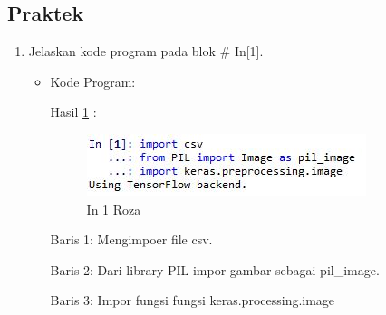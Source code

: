 \subsection{Praktek}
\begin{enumerate}
\item Jelaskan kode program pada blok \# In[1].
\begin{itemize}
\item Kode Program:

\par Hasil \ref{in1roza} :
\begin{figure}[!hbtp]
\centering
\includegraphics[scale=0.7]{figures/prak1roza.jpg}
\caption{In 1 Roza}
\label{in1roza}
\end{figure}
\par Baris 1: Mengimpoer file csv.
\par Baris 2: Dari library PIL impor gambar sebagai pil\_image.
\par Baris 3: Impor fungsi fungsi keras.processing.image
\end{itemize}
\par


\end{enumerate}
